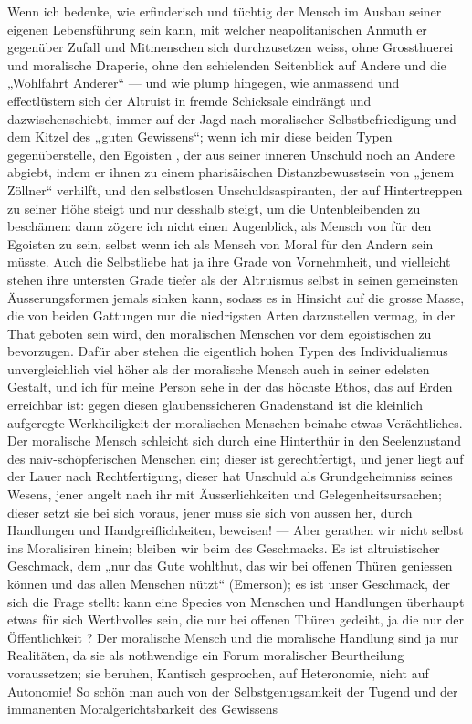 Wenn ich bedenke, wie erfinderisch und tüchtig der Mensch im Ausbau seiner eigenen Lebensführung sein kann, mit welcher neapolitanischen Anmuth er gegenüber Zufall und Mitmenschen sich durchzusetzen weiss, ohne Grossthuerei und moralische Draperie, ohne den schielenden Seitenblick auf Andere und die „Wohlfahrt Anderer“ — und wie plump hingegen, wie anmassend und effectlüstern sich der Altruist in fremde Schicksale eindrängt und dazwischenschiebt, immer auf der Jagd nach moralischer Selbstbefriedigung und dem Kitzel des „guten Gewissens“; wenn ich mir diese beiden Typen gegenüberstelle, den Egoisten , der aus seiner inneren Unschuld noch an Andere abgiebt, indem er ihnen zu einem pharisäischen Distanzbewusstsein von „jenem Zöllner“ verhilft, und den selbstlosen Unschuldsaspiranten, der auf Hintertreppen zu seiner Höhe steigt und nur desshalb steigt, um die Untenbleibenden zu beschämen: dann zögere ich nicht einen Augenblick, als Mensch von  für den Egoisten zu sein, selbst wenn ich als Mensch von Moral für den Andern sein müsste. Auch die Selbstliebe hat ja ihre Grade von Vornehmheit, und vielleicht stehen ihre untersten Grade tiefer als der Altruismus selbst in seinen gemeinsten Äusserungsformen jemals sinken kann, sodass es in Hinsicht auf die grosse Masse, die von beiden Gattungen nur die niedrigsten Arten darzustellen vermag, in der That geboten sein wird, den moralischen Menschen vor dem egoistischen  zu bevorzugen. Dafür aber stehen die eigentlich hohen Typen des Individualismus unvergleichlich viel höher als der moralische Mensch auch in seiner edelsten Gestalt, und ich für meine Person sehe in der  das höchste Ethos, das auf Erden erreichbar ist: gegen diesen glaubenssicheren Gnadenstand ist die kleinlich aufgeregte Werkheiligkeit der moralischen Menschen beinahe etwas Verächtliches. Der moralische Mensch schleicht sich durch eine Hinterthür in den Seelenzustand des naiv-schöpferischen Menschen ein; dieser ist gerechtfertigt, und jener liegt auf der Lauer nach Rechtfertigung, dieser hat Unschuld als Grundgeheimniss seines Wesens, jener angelt nach ihr mit Äusserlichkeiten und Gelegenheitsursachen; dieser setzt sie bei sich voraus, jener muss sie sich von aussen her, durch Handlungen und Handgreiflichkeiten, beweisen! — Aber gerathen wir nicht selbst ins Moralisiren hinein; bleiben wir beim  des Geschmacks. Es ist altruistischer Geschmack, dem „nur das Gute wohlthut, das wir bei offenen Thüren geniessen können und das allen Menschen nützt“ (Emerson); es ist unser Geschmack, der sich die Frage stellt: kann eine Species von Menschen und Handlungen überhaupt etwas für sich Werthvolles sein, die nur bei offenen Thüren gedeiht, ja die nur  der Öffentlichkeit ? Der moralische Mensch und die moralische Handlung sind ja nur  Realitäten, da sie als nothwendige  ein Forum moralischer Beurtheilung voraussetzen; sie beruhen, Kantisch gesprochen, auf Heteronomie, nicht auf Autonomie! So schön man auch von der Selbstgenugsamkeit der Tugend und der immanenten Moralgerichtsbarkeit des Gewissens 